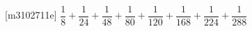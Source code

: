 [m3102711e]\quad
$\dfrac{1}{8}+\dfrac{1}{24}+\dfrac{1}{48}+\dfrac{1}{80}+
\dfrac{1}{120}+\dfrac{1}{168}+\dfrac{1}{224}+\dfrac{1}{288}$
\par
{}